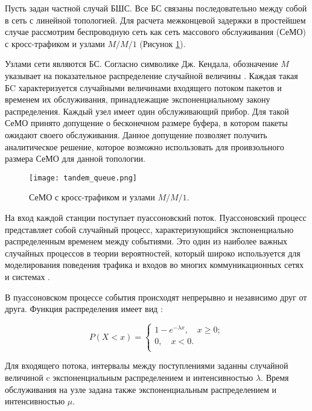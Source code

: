 Пусть задан частной случай БШС. Все БС связаны последовательно между собой в сеть с линейной топологией. Для расчета межконцевой задержки в простейшем случае рассмотрим беспроводную сеть как сеть массового обслуживания (СеМО) с кросс-трафиком и узлами $M/M/1$ (Рисунок \cref{fig:tandem_queue}). 

Узлами сети являются БС. Согласно символике Дж. Кендала, обозначение $M$ указывает на показательное распределение случайной величины \cite{VishnevskyBook, Kleinrock1975}. Каждая такая БC характеризуется случайными величинами входящего потоком пакетов и временем их обслуживания, принадлежащие экспоненциальному закону распределения. Каждый узел имеет один обслуживающий прибор. Для такой СеМО принято допущение о бесконечном размере буфера, в котором пакеты ожидают своего обслуживания. Данное допущение позволяет получить аналитическое решение, которое возможно использовать для проивзольного размера СеМО для данной топологии.

\begin{figure}[h!]
  \centering
   \texttt{[image: tandem\_queue.png]}
\caption{СеМО с кросс-трафиком и узлами $M/M/1$.}
\label{fig:tandem_queue}
\end{figure}

На вход каждой станции поступает пуассоновский поток. Пуассоновский процесс представляет собой случайный процесс, характеризующийся  экспоненциально распределенным временем между событиями. Это один из наиболее важных случайных процессов в теории вероятностей, который широко используется для моделирования поведения трафика и входов во многих коммуникационных сетях и системах \cite{Kalor2018, Gao2016, Malandra2018, Seliem2019}. 

В пуассоновском процессе события происходят непрерывно и независимо друг от друга. Функция распределения имеет вид  \cite{VishnevskyBook, Kleinrock1975}:

\begin{displaymath}
P(X<x) = 
  \begin{cases}
    1 - e^{- \lambda x}, \quad x \geqslant 0; \\
    0, \quad x < 0.\\
  \end{cases}
\end{displaymath}

Для входящего потока, интервалы между поступлениями заданны случайной величиной c экспоненциальным распределением и интенсивностью $\lambda$. Время обслуживания на узле задана также экспоненциальным распределением и интенсивностью $\mu$. 


